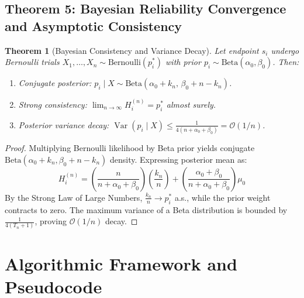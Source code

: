 \documentclass[journal,10pt,twocolumn]{IEEEtran}
\newtheorem{theorem}{Theorem}
\begin{document}
\subsection{Theorem 5: Bayesian Reliability Convergence and Asymptotic Consistency}
\label{subsec:proof_bayesian}

\begin{theorem}[Bayesian Consistency and Variance Decay]
Let endpoint $s_i$ undergo Bernoulli trials $X_1, \dots, X_n \sim \text{Bernoulli}(p_i^*)$ with prior $p_i \sim \text{Beta}(\alpha_0, \beta_0)$. Then:
\begin{enumerate}
    \item Conjugate posterior: $p_i \mid X \sim \text{Beta}(\alpha_0 + k_n, \, \beta_0 + n - k_n)$.
    \item Strong consistency: $\lim_{n \to \infty} H_i^{(n)} = p_i^*$ almost surely.
    \item Posterior variance decay: $\operatorname{Var}(p_i \mid X) \le \frac{1}{4(n + \alpha_0 + \beta_0)} = \mathcal{O}(1/n)$.
\end{enumerate}
\end{theorem}

\begin{proof}
Multiplying Bernoulli likelihood by Beta prior yields conjugate $\text{Beta}(\alpha_0 + k_n, \beta_0 + n - k_n)$ density. Expressing posterior mean as:
\begin{equation}
    H_i^{(n)} = \left(\frac{n}{n + \alpha_0 + \beta_0}\right)\left(\frac{k_n}{n}\right) + \left(\frac{\alpha_0 + \beta_0}{n + \alpha_0 + \beta_0}\right)\mu_0
\end{equation}
By the Strong Law of Large Numbers, $\frac{k_n}{n} \to p_i^*$ a.s., while the prior weight contracts to zero. The maximum variance of a Beta distribution is bounded by $\frac{1}{4(T_n + 1)}$, proving $\mathcal{O}(1/n)$ decay.
\end{proof}

\section{Algorithmic Framework and Pseudocode}
\label{sec:algorithms}
\end{document}
